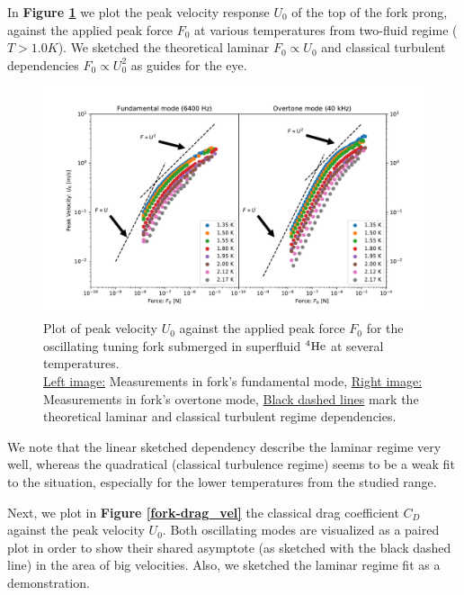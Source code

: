 \newpage

In \textbf{Figure \ref{fork-vel_force}} we plot the peak velocity response $U_0$ of the top of the fork prong, against the applied peak force $F_0$ at various temperatures from two-fluid regime ($T > 1.0\unit{K}$). We sketched the theoretical laminar $F_0 \propto U_0$ and classical turbulent dependencies $F_0 \propto U_0^2$ as guides for the eye.

\begin{figure}[h]
	\hspace{-1.7cm}
	\includegraphics[width=1.2\textwidth]{graphics/results/fork-vel_force}
	\caption{Plot of peak velocity $U_0$ against the applied peak force $F_0$ for the oscillating tuning fork submerged in superfluid ${}^4\mathrm{He}$ at several temperatures.\\
	\underline{Left image:} Measurements in fork's fundamental mode, \underline{Right image:} Measurements in fork's overtone mode, \underline{Black dashed lines} mark the theoretical laminar and classical turbulent regime dependencies.}
	\label{fork-vel_force}
\end{figure}

We note that the linear sketched dependency describe the laminar regime very well, whereas the quadratical (classical turbulence regime) seems to be a weak fit to the situation, especially for the lower temperatures from the studied range.

Next, we plot in \textbf{Figure \ref{fork-drag_vel}} the classical drag coefficient $C_D$ against the peak velocity $U_0$. Both oscillating modes are visualized as a paired plot in order to show their shared asymptote (as sketched with the black dashed line) in the area of big velocities. Also, we sketched the laminar regime fit as a demonstration.

